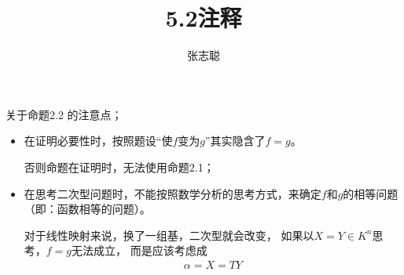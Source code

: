 \documentclass{article}
\begin{document}
\title{5.2注释}
\author{张志聪}
\maketitle

\begin{zremark}
  关于命题2.2 的注意点；
\end{zremark}

\begin{itemize}
  \item 在证明必要性时，按照题设“使$f$变为$g$”其实隐含了$f = g$。

        否则命题在证明时，无法使用命题2.1；

  \item 在思考二次型问题时，不能按照数学分析的思考方式，来确定$f$和$g$的相等问题（即：函数相等的问题）。

        对于线性映射来说，换了一组基，二次型就会改变，
        如果以$X = Y \in K^n$思考，$f = g$无法成立，
        而是应该考虑成
        \begin{align*}
          \alpha = X = T Y
        \end{align*}
\end{itemize}
\end{document}
